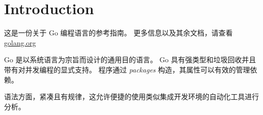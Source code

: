 
\chapter{Introduction}
这是一份关于 Go 编程语言的参考指南。
更多信息以及其余文档，请查看 \href{www.golang.org}{golang.org}

Go 是以系统语言为宗旨而设计的通用目的语言。
Go 具有强类型和垃圾回收并且带有对并发编程的显式支持。
程序通过 \emph{packages} 构造，其属性可以有效的管理依赖。

语法方面，紧凑且有规律，这允许便捷的使用类似集成开发环境的自动化工具进行分析。